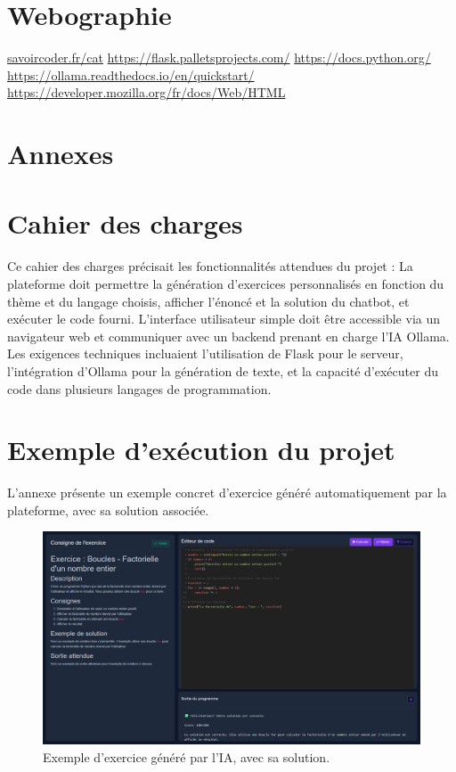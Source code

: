 \documentclass[a4paper, 12pt, twoside]{article}
\begin{document}
\newpage
\section{Webographie}
\begin{thebibliography}{2}
 \url{savoircoder.fr/cat}
 \url{https://flask.palletsprojects.com/}
 \url{https://docs.python.org/}
 \url{https://ollama.readthedocs.io/en/quickstart/}
 \url{https://developer.mozilla.org/fr/docs/Web/HTML}
\end{thebibliography}

\newpage
\section{Annexes}
\appendix
\makeatletter
\def\@seccntformat#1{Annexe~\csname the#1\endcsname:\quad}
\makeatother

	\section{Cahier des charges}
Ce cahier des charges précisait les fonctionnalités attendues du projet : La plateforme doit permettre la génération d'exercices personnalisés en fonction du thème et du langage choisis, afficher l'énoncé et la solution du chatbot, et exécuter le code fourni. L'interface utilisateur simple doit être accessible via un navigateur web et communiquer avec un backend prenant en charge l'IA Ollama. Les exigences techniques incluaient l'utilisation de Flask pour le serveur, l'intégration d'Ollama pour la génération de texte, et la capacité d'exécuter du code dans plusieurs langages de programmation.

	\section{Exemple d'exécution du projet}
L'annexe présente un exemple concret d'exercice généré automatiquement par la plateforme, avec sa solution associée. 

\begin{figure}[h!]
\centering
\includegraphics[width=1.3\textwidth]{exercice.png}
\caption{Exemple d'exercice généré par l'IA, avec sa solution.}
\label{fig:exercice}
\end{figure}
\end{document}
